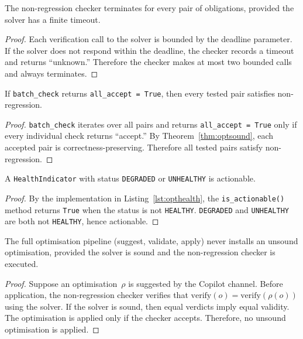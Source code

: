 \documentclass[11pt]{article}
\begin{document}
\begin{lemma}%
\label{lem:nonregterm}
The non-regression checker terminates for every pair
of obligations, provided the solver has a finite timeout.
\end{lemma}
\begin{proof}
Each verification call to the solver is bounded by the
deadline parameter.  If the solver does not respond within
the deadline, the checker records a timeout and returns
``unknown.''  Therefore the checker makes at most two
bounded calls and always terminates.
\end{proof}

\begin{lemma}%
\label{lem:batchsound}
If \texttt{batch\_check} returns \texttt{all\_accept = True},
then every tested pair satisfies non-regression.
\end{lemma}
\begin{proof}
\texttt{batch\_check} iterates over all pairs and returns
\texttt{all\_accept = True} only if every individual check
returns ``accept.''  By Theorem~\ref{thm:optsound}, each
accepted pair is correctness-preserving.  Therefore all
tested pairs satisfy non-regression.
\end{proof}

\begin{lemma}%
\label{lem:healthaction}
A \texttt{HealthIndicator} with status
\texttt{DEGRADED} or \texttt{UNHEALTHY} is actionable.
\end{lemma}
\begin{proof}
By the implementation in Listing~\ref{lst:opthealth},
the \texttt{is\_actionable()} method returns \texttt{True}
when the status is not \texttt{HEALTHY}.  \texttt{DEGRADED}
and \texttt{UNHEALTHY} are both not \texttt{HEALTHY}, hence
actionable.
\end{proof}

\begin{proposition}%
\label{prop:optsafety}
The full optimisation pipeline (suggest, validate, apply)
never installs an unsound optimisation, provided the solver
is sound and the non-regression checker is executed.
\end{proposition}
\begin{proof}
Suppose an optimisation~$\rho$ is suggested by the Copilot
channel.  Before application, the non-regression checker
verifies that $\mathrm{verify}(o) = \mathrm{verify}(\rho(o))$
using the solver.  If the solver is sound, then equal verdicts
imply equal validity.  The optimisation is applied only if the
checker accepts.  Therefore, no unsound optimisation is applied.
\end{proof}
\end{document}
